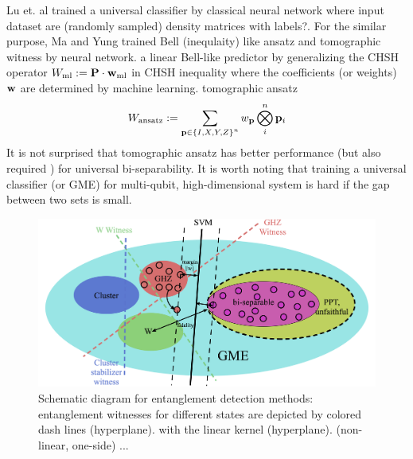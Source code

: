 \documentclass[
reprint,
aps,
pra,
floatfix,
]{revtex4-2}
\theoremstyle{plain}
\theoremstyle{definition}
\newcommand{\ew}{W}
\newcommand{\ansatz}{\textup{ansatz}}
\newcommand{\sx}{\hat{\sigma}_x}
\newcommand{\sy}{\hat{\sigma}_y}
\newcommand{\sz}{\hat{\sigma}_z}
\begin{document}
Lu et. al \cite{luSeparabilityEntanglementClassifierMachine2018} 
trained a universal  classifier by classical neural network
where input dataset are (randomly sampled) density matrices with labels?.
For the similar purpose, Ma and Yung \cite{maTransformingBellInequalities2018} trained Bell (inequlaity) like ansatz and tomographic witness by neural network. 
a linear Bell-like predictor by generalizing the CHSH operator $\ew_{\text{ml}}:=\vb{P}\cdot\vb{w}_{\text{ml}}$ in CHSH inequality where the coefficients (or weights) $\vb{w}$ are determined by machine learning.
tomographic ansatz 
\begin{equation}
	\ew_{\ansatz} := 
	\sum_{\vb{p}\in \qty{I,X,Y,Z}^n} w_{\vb{p}}  
	\bigotimes_i^n 
	\vb{p}_i
	\label{eq:tomographic_ansatz}
\end{equation}
It is not surprised that tomographic ansatz has better performance 
(but also required \cite{luTomographyNecessaryUniversal2016}) for universal bi-separability.
It is worth noting that training a universal classifier (or GME) for multi-qubit, high-dimensional system is hard if the gap between two sets is small.

\begin{figure}[!ht]
	\centering
		\centering
		\includegraphics[width=.8\linewidth]{schematic_entangle.png}
	\caption{Schematic diagram for entanglement detection methods: entanglement witnesses for different states are depicted by colored dash lines (hyperplane).  with the linear kernel (hyperplane).  (non-linear, one-side) ... }
	\label{fig:entangle}
\end{figure}
\end{document}
